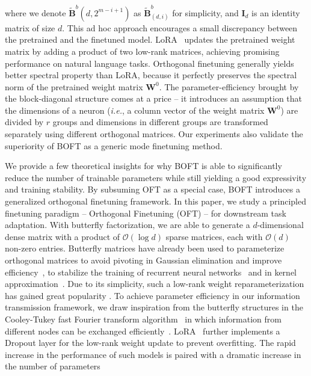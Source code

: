 where we denote $\tilde{\bm{B}}^b(d,2^{m - i+1})$ as $\tilde{\bm{B}}^b_{(d,i)}$ for simplicity, and $\bm{I}_d$ is an identity matrix of size $d$. This ad hoc approach encourages a small discrepancy between the pretrained and the finetuned model. LoRA~\cite{hulora2022} updates the pretrained weight matrix by adding a product of two low-rank matrices, achieving promising performance on natural language tasks. Orthogonal finetuning generally yields better spectral property than LoRA, because it perfectly preserves the spectral norm of the pretrained weight matrix $\bm{W}^0$. The parameter-efficiency brought by the block-diagonal structure comes at a price -- it introduces an assumption that the dimensions of a neuron (\emph{i.e.}, a column vector of the weight matrix $\bm{W}^0$) are divided by $r$ groups and dimensions in different groups are transformed separately using different orthogonal matrices. Our experiments also validate the superiority of BOFT as a generic mode finetuning method. \item We provide a few theoretical insights for why BOFT is able to significantly reduce the number of trainable parameters while still yielding a good expressivity and training stability. By subsuming OFT as a special case, BOFT introduces a generalized orthogonal finetuning framework. In this paper, we study a principled finetuning paradigm -- Orthogonal Finetuning (OFT) -- for downstream task adaptation. With butterfly factorization, we are able to generate a $d$-dimensional dense matrix with a product of $\mathcal{O}(\log d)$ sparse matrices, each with $\mathcal{O}(d)$ non-zero entries. Butterfly matrices have already been used to parameterize  orthogonal matrices to avoid pivoting in Gaussian elimination and improve efficiency~\cite{parker1995random}, to stabilize the training of recurrent neural networks~\cite{jing2017tunable} and in kernel approximation~\cite{munkhoeva2018quadrature}. Due to its simplicity, such a low-rank weight reparameterization has gained great popularity \cite{dettmers2023qlora,zi2023delta,chavan2023one}. To achieve parameter efficiency in our information transmission framework, we draw inspiration from the butterfly structures in the Cooley-Tukey fast Fourier transform algorithm~\cite{cooley1965algorithm} in which information from different nodes can be exchanged efficiently~\cite{klasing1994broadcasting}. LoRA~\cite{hulora2022} further implements a Dropout layer for the low-rank weight update to prevent overfitting. The rapid increase in the performance of such models is paired with a dramatic increase in the number of parameters

